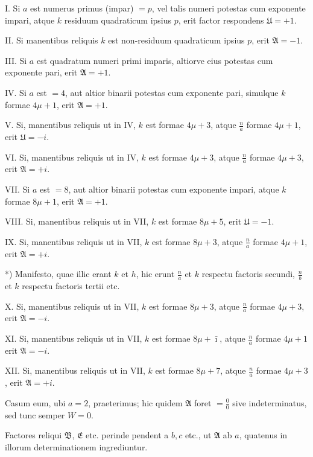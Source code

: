 \documentclass[10pt]{article}
\begin{document}
I. Si \(a\) est numerus primus (impar) \(=p\), vel talis numeri potestas cum exponente impari, atque \(k\) residuum quadraticum ipsius \(p\), erit factor respondens \(\mathfrak{U}=+1\).

II. Si manentibus reliquis \(k\) est non-residuum quadraticum ipsius \(p\), erit \(\mathfrak{A}=-1\).

III. Si \(a\) est quadratum numeri primi imparis, altiorve eius potestas cum exponente pari, erit \(\mathfrak{A}=+1\).

IV. Si \(a\) est \(=4\), aut altior binarii potestas cum exponente pari, simulque \(k\) formae \(4 \mu+1\), erit \(\mathfrak{A}=+1\).

V. Si, manentibus reliquis ut in IV, \(k\) est formae \(4 \mu+3\), atque \(\frac{n}{a}\) formae \(4 \mu+1\), erit \(\mathfrak{U}=-i\).

VI. Si, manentibus reliquis ut in IV, \(k\) est formae \(4 \mu+3\), atque \(\frac{n}{a}\) formae \(4 \mu+3\), erit \(\mathfrak{A}=+i\).

VII. Si \(a\) est \(=8\), aut altior binarii potestas cum exponente impari, atque \(k\) formae \(8 \mu+1\), erit \(\mathfrak{A}=+1\).

VIII. Si, manentibus reliquis ut in VII, \(k\) est formae \(8 \mu+5\), erit \(\mathfrak{U}=-1\).

IX. Si, manentibus reliquis ut in VII, \(k\) est formae \(8 \mu+3\), atque \(\frac{n}{a}\) formae \(4 \mu+1\), erit \(\mathfrak{A}=+i\).

*) Manifesto, quae illic erant \(k\) et \(h\), hic erunt \(\frac{n}{a}\) et \(k\) respectu factoris secundi, \(\frac{n}{b}\) et \(k\) respectu factoris tertii etc.

X. Si, manentibus reliquis ut in VII, \(k\) est formae \(8 \mu+3\), atque \(\frac{n}{a}\) formae \(4 \mu+3\), erit \(\mathfrak{A}=-i\).

XI. Si, manentibus reliquis ut in VII, \(k\) est formae \(8 \mu+\bar{\imath}\), atque \(\frac{n}{a}\) formae \(4 \mu+1\) erit \(\mathfrak{A}=-i\).

XII. Si, manentibus reliquis ut in VII, \(k\) est formae \(8 \mu+7\), atque \(\frac{n}{a}\) formae \(4 \mu+3\), erit \(\mathfrak{A}=+i\).

Casum eum, ubi \(a=2\), praeterimus; hic quidem \(\mathfrak{A}\) foret \(=\frac{0}{0}\) sive indeterminatus, sed tunc semper \(W=0\).

Factores reliqui \(\mathfrak{B}\), \(\mathfrak{E}\) etc. perinde pendent a \(b, c\) etc., ut \(\mathfrak{A}\) ab \(a\), quatenus in illorum determinationem ingrediuntur.
\end{document}
